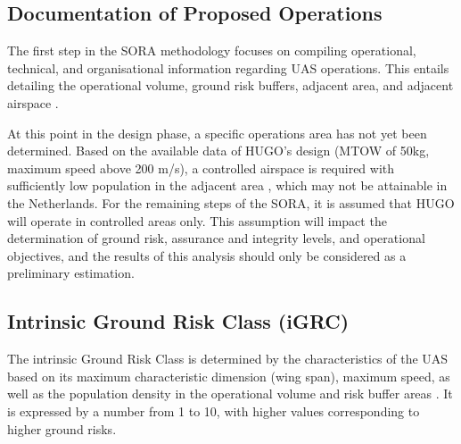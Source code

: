 \subsection{Documentation of Proposed Operations}
The first step in the SORA methodology focuses on compiling operational, technical, and organisational information regarding UAS operations. This entails detailing the operational volume, ground risk buffers, adjacent area, and adjacent airspace \cite{Jarus_main}\cite{Jarus_Annex_A}.

At this point in the design phase, a specific operations area has not yet been determined. Based on the available data of HUGO's design (MTOW of 50kg, maximum speed above 200 m/s), a controlled airspace is required with sufficiently low population in the adjacent area \cite{Jarus_main}, which may not be attainable in the Netherlands. For the remaining steps of the SORA, it is assumed that HUGO will operate in controlled areas only. This assumption will impact the determination of ground risk, assurance and integrity levels, and operational objectives, and the results of this analysis should only be considered as a preliminary estimation.


\subsection{Intrinsic Ground Risk Class (iGRC)}
The intrinsic Ground Risk Class is determined by the characteristics of the UAS based on its maximum characteristic dimension (wing span), maximum speed, as well as the population density in the operational volume and risk buffer areas \cite{Jarus_main}. It is expressed by a number from 1 to 10, with higher values corresponding to higher ground risks.

